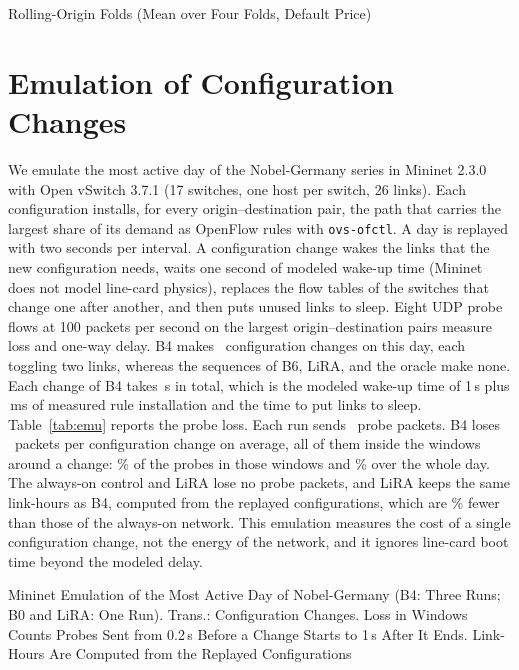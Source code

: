 \documentclass[preprint,12pt]{elsarticle}
\begin{document}
\begin{table}[h!]
\centering
\caption{Rolling-Origin Folds (Mean over Four Folds, Default Price)}
\label{tab:folds}
\footnotesize
\setlength{\tabcolsep}{3pt}
\begin{adjustbox}{max width=\linewidth}\end{adjustbox}
\end{table}


\section{Emulation of Configuration Changes}\label{sec:res-emu}

We emulate the most active day of the Nobel-Germany series in Mininet 2.3.0 with Open vSwitch 3.7.1 (17 switches, one host per switch, 26 links). Each configuration installs, for every origin--destination pair, the path that carries the largest share of its demand as OpenFlow rules with \texttt{ovs-ofctl}. A day is replayed with two seconds per interval. A configuration change wakes the links that the new configuration needs, waits one second of modeled wake-up time (Mininet does not model line-card physics), replaces the flow tables of the switches that change one after another, and then puts unused links to sleep. Eight UDP probe flows at 100 packets per second on the largest origin--destination pairs measure loss and one-way delay. B4 makes \emuTrans\ configuration changes on this day, each toggling two links, whereas the sequences of B6, LiRA, and the oracle make none. Each change of B4 takes \emuTransS\,s in total, which is the modeled wake-up time of 1\,s plus \emuRuleMs\,ms of measured rule installation and the time to put links to sleep. Table~\ref{tab:emu} reports the probe loss. Each run sends \emuProbePkts\ probe packets. B4 loses \emuLostPerTrans\ packets per configuration change on average, all of them inside the windows around a change: \emuLossWin\% of the probes in those windows and \emuLossAll\% over the whole day. The always-on control and LiRA lose no probe packets, and LiRA keeps the same link-hours as B4, computed from the replayed configurations, which are \emuLinkSave\% fewer than those of the always-on network. This emulation measures the cost of a single configuration change, not the energy of the network, and it ignores line-card boot time beyond the modeled delay.




\begin{table}[h!]
\centering
\caption{Mininet Emulation of the Most Active Day of Nobel-Germany (B4: Three Runs; B0 and LiRA: One Run). Trans.: Configuration Changes. Loss in Windows Counts Probes Sent from 0.2\,s Before a Change Starts to 1\,s After It Ends. Link-Hours Are Computed from the Replayed Configurations}
\label{tab:emu}
\footnotesize
\setlength{\tabcolsep}{4pt}
\begin{adjustbox}{max width=\linewidth}\end{adjustbox}
\end{table}
\end{document}
